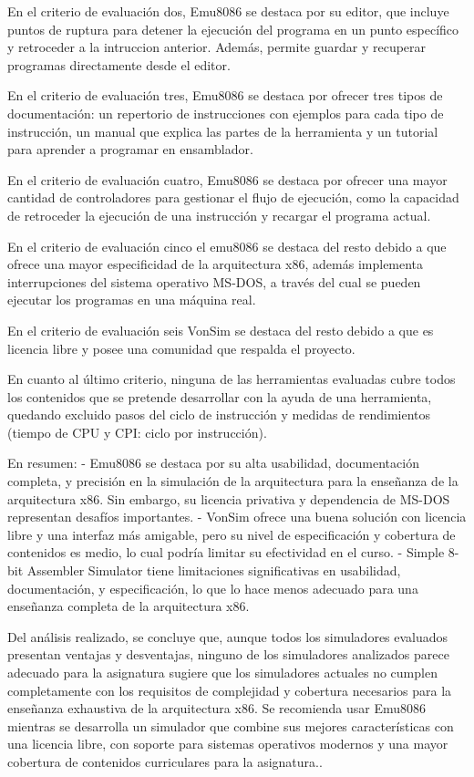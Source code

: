 \documentclass[12pt,twoside]{templates/unerthesis}
\begin{document}
En el criterio de evaluación dos, Emu8086 se destaca por su editor, que incluye puntos de ruptura para detener la ejecución del programa en un punto específico y retroceder a la intruccion anterior. Además, permite guardar y recuperar programas directamente desde el editor.

En el criterio de evaluación tres, Emu8086 se destaca por ofrecer tres tipos de documentación: un repertorio de instrucciones con ejemplos para cada tipo de instrucción, un manual que explica las partes de la herramienta y un tutorial para aprender a programar en ensamblador.

En el criterio de evaluación cuatro, Emu8086 se destaca por ofrecer una mayor cantidad de controladores para gestionar el flujo de ejecución, como la capacidad de retroceder la ejecución de una instrucción y recargar el programa actual.

En el criterio de evaluación cinco el emu8086 se destaca del resto debido a que ofrece una mayor especificidad de la arquitectura x86, además implementa interrupciones del sistema operativo MS-DOS, a través del cual se pueden ejecutar los programas en una máquina real.

En el criterio de evaluación seis VonSim se destaca del resto debido a que es licencia libre y posee una comunidad que respalda el proyecto.

En cuanto al último criterio, ninguna de las herramientas evaluadas cubre todos los contenidos que se pretende desarrollar con la ayuda de una herramienta, quedando excluido pasos del ciclo de instrucción y medidas de rendimientos (tiempo de CPU y CPI: ciclo por instrucción).

En resumen:
- Emu8086 se destaca por su alta usabilidad, documentación completa, y precisión en la simulación de la arquitectura para la enseñanza de la arquitectura x86. Sin embargo, su licencia privativa y dependencia de MS-DOS representan desafíos importantes.
- VonSim ofrece una buena solución con licencia libre y una interfaz más amigable, pero su nivel de especificación y cobertura de contenidos es medio, lo cual podría limitar su efectividad en el curso.
- Simple 8-bit Assembler Simulator tiene limitaciones significativas en usabilidad, documentación, y especificación, lo que lo hace menos adecuado para una enseñanza completa de la arquitectura x86.

Del análisis realizado, se concluye que, aunque todos los simuladores evaluados presentan ventajas y desventajas, ninguno de los simuladores analizados parece adecuado para la asignatura sugiere que los simuladores actuales no cumplen completamente con los requisitos de complejidad y cobertura necesarios para la enseñanza exhaustiva de la arquitectura x86. Se recomienda usar Emu8086 mientras se desarrolla un simulador que combine sus mejores características con una licencia libre, con soporte para sistemas operativos modernos y una mayor cobertura de contenidos curriculares para la asignatura..
\end{document}
